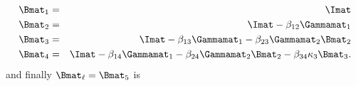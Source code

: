 \begin{eqnarray}
\Bmat_1 &=& \Imat \nonumber \\
\Bmat_2 &=& \Imat - \beta_{12} \Gammamat_{1} \nonumber\\
\Bmat_3 &=& \Imat - \beta_{13} \Gammamat_{1} - \beta_{23} \Gammamat_{2} \Bmat_2\\
\Bmat_4 &=& \Imat - \beta_{14} \Gammamat_1  - \beta_{24} \Gammamat_2 \Bmat_2 - \beta_{34} \kappa_3 \Bmat_3.
\end{eqnarray}
and finally $\Bmat_\ell = \Bmat_5$ is
